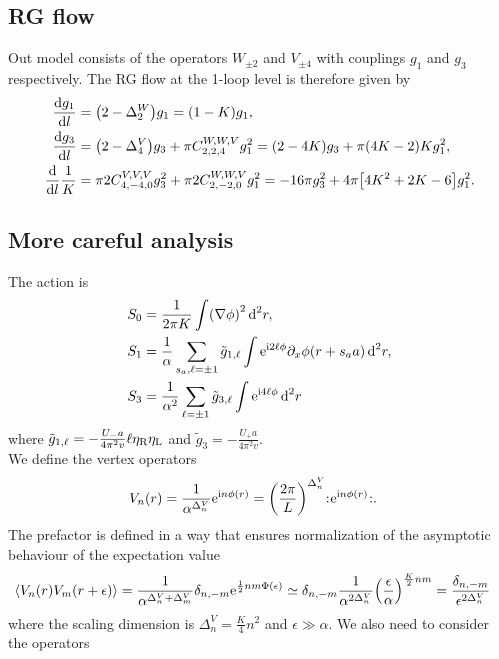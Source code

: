 \documentclass[english, parskip=full]{scrartcl}
\begin{document}
\subsection{RG flow}
Out model consists of the operators $W_{\pm 2}$ and $V_{\pm 4}$ with couplings $g_1$ and $g_3$ respectively.
The RG flow at the 1-loop level is therefore given by
\begin{align}
\frac{\d g_1}{\d l} &= \kla*{2 - \Delta_2^W}g_1 = \kla*{1-K}g_1,\\
\frac{\d g_3}{\d l} &= \kla*{2 - \Delta_4^V}g_3 + \pi C^{W,W,V}_{2,2,4} g_1^2 = \kla*{2 - 4K} g_3 + \pi \kla*{4K-2} K g_1^2,\\
\frac{\d}{\d l} \frac{1}{K} &= \pi 2C^{V,V,V}_{4,-4,0} g_3^2 + \pi 2C^{W,W,V}_{2,-2,0} g_1^2 = -16 \pi g_3^2 + 4\pi\klb*{4K^2+2K - 6} g_1^2.
\end{align}
\subsection{More careful analysis}
The action is
\begin{align}
S_0 &= \frac{1}{2\pi K} \int  \kla*{\nabla\phi}^2\,\d^2r,\\
S_1 &= \frac{1}{\alpha} \sum_{s_a,\ell=\pm 1} \tilde{g}_{1,\ell} \int \powe{\i 2\ell \phi} \partial_x\phi(r+s_aa)\,\d^2r,\\
S_3 &= \frac{1}{\alpha^2} \sum_{\ell=\pm 1} \tilde{g}_{3,\ell} \int \powe{\i 4\ell\phi}\,\d^2r
\end{align}
where $\tilde{g}_{1,\ell} = -\frac{U_-a}{4\pi^2 v} \ell \eta_{\text{R}} \eta_{\text{L}}$ and $\tilde{g}_3=-\frac{U_+a}{4\pi^2 v}$.\\
We define the vertex operators
\begin{align}
V_n(r) &= \frac{1}{\alpha^{\Delta^V_n}} \powe{\i n\phi(r)} = \kla*{\frac{2\pi}{L}}^{\Delta^V_n} \normord{\powe{\i n\phi(r)}}.
\end{align}
The prefactor is defined in a way that ensures normalization of the asymptotic behaviour of the expectation value
\begin{align}
\bra*{V_n(r) V_m(r+\epsilon)} &= \frac{1}{\alpha^{\Delta^V_n + \Delta^V_m}} \delta_{n,-m} \powe{\frac{1}{2} nm \Phi(\epsilon)} \simeq \delta_{n,-m} \frac{1}{\alpha^{2\Delta^V_n}} \kla*{\frac{\epsilon}{\alpha}}^{\frac{K}{2}nm} = \frac{\delta_{n,-m}}{\epsilon^{2\Delta^V_n}}
\end{align}
where the scaling dimension is $\Delta^V_n=\frac{K}{4}n^2$ and $\epsilon\gg\alpha$.
We also need to consider the operators
\end{document}
